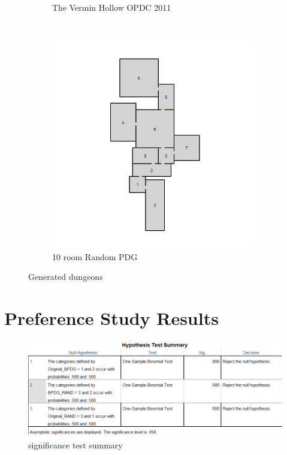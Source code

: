 \documentclass{UoYCSproject}
\begin{document}
\begin{figure}[htb]
\begin{subfigure}[b]{0.45\textwidth}
    \caption{The Vermin Hollow OPDC 2011}
  \end{subfigure}
  ~
  \begin{subfigure}[b]{0.45\textwidth}
    \centering
    \includegraphics[width=\textwidth]{figures/generated/RAND_10_6.jpg}
    \caption{10 room Random PDG}
  \end{subfigure}
  \caption{Generated dungeons}
  \label{fig:gen_dungeons}
\end{figure}

\section{Preference Study Results}
\label{app:preference_study_results}

\begin{figure}[htb]
  \centering
  \includegraphics[width=\textwidth]{ExternalValidation/hypothesis_test_summary.png}
  \caption{significance test summary}
  \label{fig:binomial_test_summary}
\end{figure}
\end{document}
